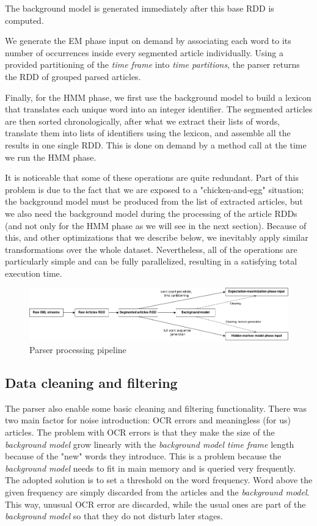 The background model is generated immediately after this base RDD is computed.

We generate the EM phase input on demand by associating each word to its number of occurrences inside every segmented article individually. Using a provided partitioning of the \emph{time frame} into \emph{time partitions}, the parser returns the RDD of grouped parsed articles.

Finally, for the HMM phase, we first use the background model to build a lexicon that translates each unique word into an integer identifier. The segmented articles are then sorted chronologically, after what we extract their lists of words, translate them into lists of identifiers using the lexicon, and assemble all the results in one single RDD. This is done on demand by a method call at the time we run the HMM phase.

It is noticeable that some of these operations are quite redundant. Part of this problem is due to the fact that we are exposed to a "chicken-and-egg" situation; the background model must be produced from the list of extracted articles, but we also need the background model during the processing of the article RDDs (and not only for the HMM phase as we will see in the next section). Because of this, and other optimizations that we describe below, we inevitably apply similar transformations over the whole dataset. Nevertheless, all of the operations are particularly simple and can be fully parallelized, resulting in a satisfying total execution time.

\begin{figure}
   \includegraphics[width=\textwidth]{parser_processing_steps.png}
   \caption{\label{fig:parser_processing_steps} Parser processing pipeline}
\end{figure}


\subsection{Data cleaning and filtering}

The parser also enable some basic cleaning and filtering functionality. There was two main factor for noise introduction: OCR errors and meaningless (for us) articles. The problem with OCR errors is that they make the size of the \emph{background model} grow linearly with the \emph{background model time frame} length because of the "new" words they introduce. This is a problem because the \emph{background model} needs to fit in main memory and is queried very frequently. The adopted solution is to set a threshold on the word frequency. Word above the given frequency are simply discarded from the articles and the \emph{background model}. This way, unusual OCR error are discarded, while the usual ones are part of the \emph{background model} so that they do not disturb later stages.

